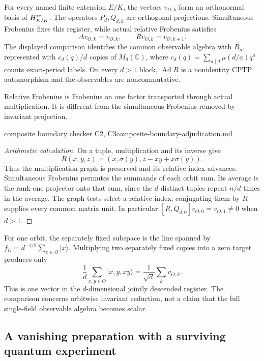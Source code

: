 \begin{proposition}
\statusProved\quad
For every named finite extension $E/K$, the vectors $v_{O,k}$ form an
orthonormal basis of $H_{E/K}^{\rm rel}$. The operators $P_d,Q_{d,k}$
are orthogonal projections. Simultaneous Frobenius fixes this register,
while actual relative Frobenius satisfies
\[
 \Delta v_{O,k}=v_{O,k},\qquad Rv_{O,k}=v_{O,k+1}.
\]
The displayed comparison identifies the common observable algebra with
$B_n$, represented with $c_d(q)/d$ copies of $M_d(\mathbb C)$, where
$c_d(q)=\sum_{a\mid d}\mu(d/a)q^a$ counts exact-period labels.
On every $d>1$ block, $\operatorname{Ad}R$ is a nonidentity CPTP
automorphism and the observables are noncommutative.
\end{proposition}
\begin{scope}
Relative Frobenius is Frobenius on one factor transported through actual
multiplication. It is different from the simultaneous Frobenius removed
by invariant projection.
\end{scope}
{composite boundary checker C2, C3}{composite-boundary-adjudication.md}

\begin{proof}[Arithmetic calculation]
On a tuple, multiplication and its inverse give
\[
 R(x,y,z)=(x,\sigma(y),z-xy+x\sigma(y)).
\]
Thus the multiplication graph is preserved and its relative index advances.
Simultaneous Frobenius permutes the summands of each orbit sum. Its
average is the rank-one projector onto that sum, since the $d$ distinct
tuples repeat $n/d$ times in the average. The graph tests select a relative
index; conjugating them by $R$ supplies every common matrix unit.
In particular $[R,Q_{d,0}]v_{O,0}=v_{O,1}\ne0$ when $d>1$.
\end{proof}

For one orbit, the separately fixed subspace is the line spanned by
$f_O=d^{-1/2}\sum_{x\in O}|x\rangle$. Multiplying two separately fixed
copies into a zero target produces only
\[
 \frac1d\sum_{x,y\in O}|x,y,xy\rangle
       =\frac1{\sqrt d}\sum_kv_{O,k}.
\]
This is one vector in the $d$-dimensional jointly descended register.
The comparison concerns orbitwise invariant reduction, not a claim that
the full single-field observable algebra becomes scalar.

\subsection{A vanishing preparation with a surviving quantum experiment}

